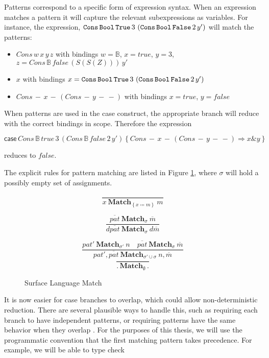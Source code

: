 Patterns correspond to a specific form of expression syntax.
When an expression matches a pattern it will capture the relevant subexpressions as variables.
For instance, the expression,
  $\mathtt{Cons}{}\,\mathtt{Bool}{}\,\mathtt{True}{}\,3\,\left(\mathtt{Cons}{}\,\mathtt{Bool}{}\,\mathtt{False}{}\,2\,y'\right)$
  will match the patterns:
\begin{itemize}
\item $Cons\,w\,x\,y\,z$ with bindings $w=\mathbb{B}$, $x=true$, $y=3$, $z=Cons\,\mathbb{B}\,false\,\left(S\left(S\left(Z\right)\right)\right)\,y'$
\item $x$ with bindings $x = \mathtt{Cons}{}\,\mathtt{Bool}{}\,\mathtt{True}{}\,3\,\left(\mathtt{Cons}{}\,\mathtt{Bool}{}\,\mathtt{False}{}\,2\,y'\right)$
\item $Cons\,-\,x\,-\,\left(Cons\,-\,y\,-\,-\right)$ with bindings $x = true$, $y = false$
\end{itemize}
When patterns are used in the case construct, the appropriate branch will reduce with the correct bindings in scope.
Therefore the expression 

$\mathsf{case}\,Cons\,\mathbb{B}\,true\,3\,\left(Cons\,\mathbb{B}\,false\,2\,y'\right)\left\{ Cons\,-\,x\,-\,\left(Cons\,-\,y\,-\,-\right)\Rightarrow x\&y\right\} $

reduces to $false$.

The explicit rules for pattern matching are listed in Figure \ref{fig:surface-data-match}, where $\sigma$ will hold a possibly empty set of assignments.

\begin{figure}
\[
\frac{\,}{x\ \mathbf{Match}_{\left\{ x\coloneqq m\right\} }\ m}
\]

\[
\frac{\overline{pat}\ \mathbf{Match}_{\sigma}\ \overline{m}}{d\overline{pat}\ \mathbf{Match}_{\sigma}\ d\overline{m}}
\]

\[
\frac{pat'\ \mathbf{Match}_{\sigma'}\ n\quad\overline{pat}\ \mathbf{Match}_{\sigma}\ \overline{m}}{pat',\overline{pat}\ \mathbf{Match}_{\sigma'\cup\sigma}\ n,\overline{m}}
\]
\[
\frac{\,}{.\,\mathbf{Match}_{\emptyset}\,.}
\]

\caption{Surface Language Match}
\label{fig:surface-data-match}
\end{figure}

It is now easier for case branches to overlap, which could allow non-deterministic reduction.
There are several plausible ways to handle this, such as requiring each branch to have independent patterns, or requiring patterns have the same behavior when they overlap \cite{10.1007/978-3-642-54833-8_6}.
For the purposes of this thesis, we will use the programmatic convention that the first matching pattern takes precedence.
For example, we will be able to type check

